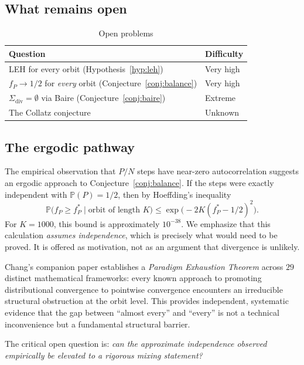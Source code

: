 \documentclass[12pt,reqno]{amsart}
\theoremstyle{plain}
\theoremstyle{definition}
\newcommand{\PP}{\mathbb{P}}
\newcommand{\fP}{f_P}
\newcommand{\fPstar}{f_P^*}
\begin{document}
\subsection{What remains open}

\begin{table}[ht]
\centering
\caption{Open problems}
\label{tab:open}
\begin{tabular}{@{}ll@{}}
\toprule
Question & Difficulty \\
\midrule
LEH for every orbit (Hypothesis~\ref{hyp:leh}) & Very high \\
$\fP \to 1/2$ for \emph{every} orbit (Conjecture~\ref{conj:balance}) & Very high \\
$\Sigma_{\mathrm{div}} = \emptyset$ via Baire (Conjecture~\ref{conj:baire}) & Extreme \\
The Collatz conjecture & Unknown \\
\bottomrule
\end{tabular}
\end{table}

\subsection{The ergodic pathway}

The empirical observation that $P/N$ steps have near-zero autocorrelation
suggests an ergodic approach to Conjecture~\ref{conj:balance}.
If the steps were exactly independent with $\PP(P) = 1/2$,
then by Hoeffding's inequality
\[
\PP\bigl(\fP \geq \fPstar \mid \text{orbit of length } K\bigr)
\leq \exp\!\bigl(-2K(\fPstar - 1/2)^2\bigr).
\]
For $K = 1000$, this bound is approximately $10^{-38}$.
We emphasize that this calculation \emph{assumes independence},
which is precisely what would need to be proved.
It is offered as motivation, not as an argument that divergence is unlikely.

Chang's companion paper \cite{chang2026paradigm} establishes a
\emph{Paradigm Exhaustion Theorem} across $29$ distinct mathematical frameworks:
every known approach to promoting distributional convergence to pointwise
convergence encounters an irreducible structural obstruction at the orbit level.
This provides independent, systematic evidence that the gap between
``almost every'' and ``every'' is not a technical inconvenience but a
fundamental structural barrier.

The critical open question is: \emph{can the approximate independence observed
empirically be elevated to a rigorous mixing statement?}
\end{document}
